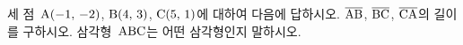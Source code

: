 세 점~$\mathrm{A}(-1,\,-2)$, $\mathrm{B}(4,\,3)$, $\mathrm{C}(5,\,1)$에 대하여 다음에 답하시오.
 $\overline{\mathrm{AB}}$, $\overline{\mathrm{BC}}$, $\overline{\mathrm{CA}}$의 길이를 구하시오.
 삼각형~$\mathrm{ABC}$는 어떤 삼각형인지 말하시오.
